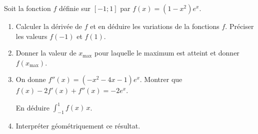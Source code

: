 \begin{question}[topic=fonction]
Soit la fonction $f$ définie sur $[-1;1]$ par $f(x) = (1-x^2)e^x$.

\begin{enumerate}
  \item Calculer la dérivée de $f$ et en déduire les variations de la
    fonctions $f$. Préciser les valeurs $f(-1)$ et $f(1)$.
  \item Donner la valeur de $x_{\max}$ pour laquelle le maximum est
    atteint et donner $f(x_{\max})$.
  \item On donne $f''(x) = \left(-x^2-4x-1\right)e^{x}$. Montrer que
    $f(x) - 2f'(x) + f''(x) = - 2e^x$.

    En déduire $\int_{-1}^1 f(x) \mathrm\,x$.
  \item Interpréter géométriquement ce résultat.
\end{enumerate}
\end{question}

